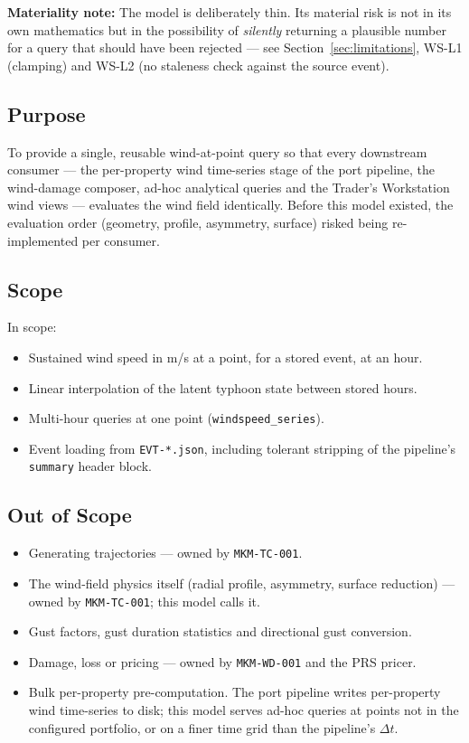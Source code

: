 \documentclass[11pt,a4paper]{article}
\begin{document}
\textbf{Materiality note:} The model is deliberately thin. Its material risk is
not in its own mathematics but in the possibility of \emph{silently} returning a
plausible number for a query that should have been rejected --- see
Section~\ref{sec:limitations}, WS-L1 (clamping) and WS-L2 (no staleness check
against the source event).

\mkmpurpose

\subsection{Purpose}
To provide a single, reusable wind-at-point query so that every downstream
consumer --- the per-property wind time-series stage of the port pipeline, the
wind-damage composer, ad-hoc analytical queries and the Trader's Workstation
wind views --- evaluates the wind field identically. Before this model existed,
the evaluation order (geometry, profile, asymmetry, surface) risked being
re-implemented per consumer.

\subsection{Scope}
In scope:
\begin{itemize}
  \item Sustained wind speed in m/s at a point, for a stored event, at an hour.
  \item Linear interpolation of the latent typhoon state between stored hours.
  \item Multi-hour queries at one point (\texttt{windspeed\_series}).
  \item Event loading from \texttt{EVT-*.json}, including tolerant stripping of
        the pipeline's \texttt{summary} header block.
\end{itemize}

\subsection{Out of Scope}
\begin{itemize}
  \item Generating trajectories --- owned by \texttt{MKM-TC-001}.
  \item The wind-field physics itself (radial profile, asymmetry, surface
        reduction) --- owned by \texttt{MKM-TC-001}; this model calls it.
  \item Gust factors, gust duration statistics and directional gust conversion.
  \item Damage, loss or pricing --- owned by \texttt{MKM-WD-001} and the PRS
        pricer.
  \item Bulk per-property pre-computation. The port pipeline writes per-property
        wind time-series to disk; this model serves ad-hoc queries at points not
        in the configured portfolio, or on a finer time grid than the pipeline's
        $\Delta t$.
\end{itemize}
\end{document}
